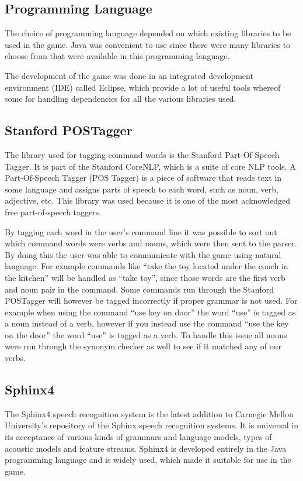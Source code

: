 \subsection{Programming Language}
The choice of programming language depended on which existing libraries to be used in the game. Java was convenient to use since there were many libraries to choose from that were available in this programming language.

The development of the game was done in an integrated development environment (IDE) called Eclipse, which provide a lot of useful tools whereof some for handling dependencies for all the various libraries used.

\subsection{Stanford POSTagger} \label{sec:postagger}
The library used for tagging command words is the Stanford Part-Of-Speech Tagger. It is part of the Stanford CoreNLP, which is a suite of core NLP tools. A Part-Of-Speech Tagger (POS Tagger) is a piece of software that reads text in some language and assigns parts of speech to each word, such as noun, verb, adjective, etc. \citep{POSTagger} This library was used because it is one of the most acknowledged free part-of-speech taggers.

By tagging each word in the user's command line it was possible to sort out which command words were verbs and nouns, which were then sent to the parser. By doing this the user was able to communicate with the game using natural language. For example commands like ``take the toy located under the couch in the kitchen'' will be handled as ``take toy'', since those words are the first verb and noun pair in the command. Some commands run through the Stanford POSTagger will however be tagged incorrectly if proper grammar is not used. For example when using the command ``use key on door'' the word ``use'' is tagged as a noun instead of a verb, however if you instead use the command ``use the key on the door'' the word ``use'' is tagged as a verb. To handle this issue all nouns were run through the synonym checker as well to see if it matched any of our verbs.

\subsection{Sphinx4} \label{sec:sphinx4}
The Sphinx4 speech recognition system is the latest addition to Carnegie Mellon University's repository of the Sphinx speech recognition systems. It is universal in its acceptance of various kinds of grammars and language models, types of acoustic models and feature streams. Sphinx4 is developed entirely in the Java programming language and is widely used, which made it suitable for use in the game. \citep{Sphinx4}

